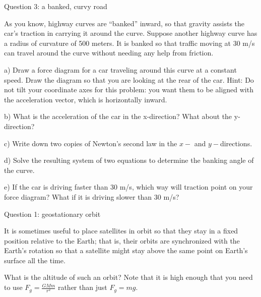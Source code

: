 \documentclass[12pt]{article}
\begin{document}
\vspace{2in}

\newpage

\centerline{\Large Question 3: a banked, curvy road}

As you know, highway curves are ``banked'' inward, so that gravity assists the car's traction in 
carrying it around the curve. Suppose another highway curve has a radius of curvature of 500 meters. 
It is banked so that traffic moving at 30 m/s can travel around the curve without
needing any help from friction.

a) Draw a force diagram for a car traveling around this curve at a constant speed. Draw the
diagram so that you are looking at the rear of the car. Hint: Do not tilt your coordinate axes for
this problem: you want them to be aligned with the acceleration vector, which is horizontally inward.

\vspace{3in}

b) What is the acceleration of the car in the x-direction? What about the y-direction?

\vspace{1in}

c) Write down two copies of Newton's second law in the $x-$ and $y-$directions.

\vspace{2in}

d) Solve the resulting system of two equations to determine the banking angle of the curve.

\vspace{3in}

e) If the car is driving faster than 30 m/s, which way will traction point on your force diagram?
What if it is driving slower than 30 m/s? 

\newpage
\Large
\centerline{}
\normalsize
\centerline{}

\medskip


\centerline{\Large Question 1: geostationary orbit}

It is sometimes useful to place satellites in orbit so that they stay in a fixed position relative to the
Earth; that is, their orbits are synchronized with the Earth's rotation so that a satellite might stay
above the same point on Earth’s surface all the time.

What is the altitude of such an orbit? Note that it is high enough that you need to use $F_g=\frac{GMm}{r^2}$
rather than just $F_g = mg$.
\end{document}
